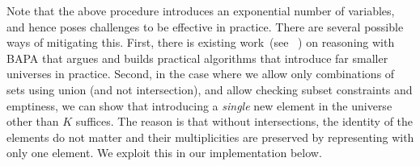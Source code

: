 Note that the above procedure introduces an exponential number of variables, and hence poses challenges
to be effective in practice. There are several possible ways of mitigating this. 
First, there is existing work~(see ~\cite{BAPA2}) on reasoning with BAPA that argues and builds practical 
algorithms that introduce far smaller universes in practice. Second, in the case where we allow only
combinations of sets using union (and not intersection), and allow checking subset constraints and emptiness,
we can show that introducing a \emph{single} new element in the universe other than $K$ suffices. 
The reason
is that without intersections, the identity of the elements do not matter and their multiplicities
are preserved by representing with only one element. We exploit this in our implementation below. 